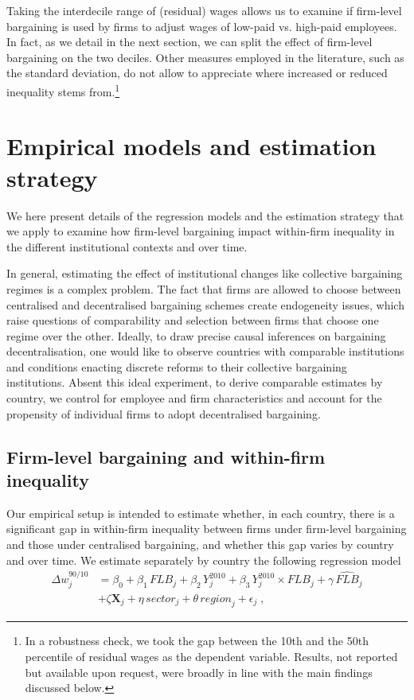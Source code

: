 \documentclass[12pt]{article}
\begin{document}
Taking the interdecile range of (residual) wages allows us to examine if firm-level bargaining is used by firms to adjust wages of low-paid vs. high-paid employees. In fact, as we detail in the next section, we can split the effect of firm-level bargaining on the two deciles. Other measures employed in the literature, such as the standard deviation, do not allow to appreciate where increased or reduced inequality stems from.\footnote{In a robustness check, we took the gap between the 10th and the 50th percentile of residual wages as the dependent variable. Results, not reported but available upon request, were broadly in line with the main findings discussed below.} 


\section{Empirical models and estimation strategy}
\label{sec:empirical}
We here present details of the regression models and the estimation strategy that we apply to examine how firm-level bargaining impact within-firm inequality in the different institutional contexts and over time.

In general, estimating the effect of institutional changes like collective bargaining regimes is a complex problem. The fact that firms are allowed to choose between centralised and decentralised bargaining schemes create endogeneity issues, which raise questions of comparability and selection between firms that choose one regime over the other. Ideally, to draw precise causal inferences on bargaining decentralisation, one would like to observe countries with comparable institutions and conditions enacting discrete reforms to their collective bargaining institutions. Absent this ideal experiment, to derive comparable estimates by country, we control for employee and firm characteristics and account for the propensity of individual firms to adopt decentralised bargaining. 

\subsection{Firm-level bargaining and within-firm inequality}
Our empirical setup is intended to estimate whether, in each country, there is a significant gap in within-firm inequality between firms under firm-level bargaining and those under centralised bargaining, and whether this gap varies by country and over time. We estimate separately by country the following regression model
\begin{equation}
\label{eq:reg_dispersion}
\begin{split}
  \Delta w^{90/10}_j &= \beta_0 + \beta_1\, \mathit{FLB}_j + \beta_2\, \mathit{Y}^{2010}_j + \beta_3\, \mathit{Y}^{2010}_j \times \mathit{FLB}_j + \gamma\, \widehat{\mathit{FLB}}_j \\
                     &+ \zeta\bm{X}_j + \eta\, \mathit{sector}_j + \theta\, \mathit{region}_j + \epsilon_j \;,
 \end{split}
\end{equation}
\end{document}
